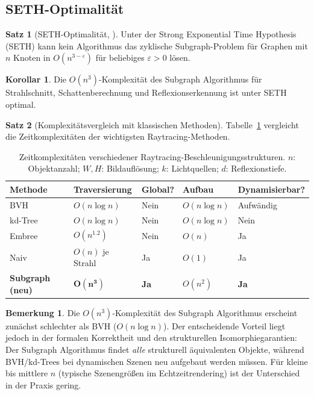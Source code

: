 ﻿\documentclass[a4paper,12pt]{article}
\theoremstyle{definition}
\newtheorem{satz}{Satz}[section]
\newtheorem{korollar}{Korollar}[section]
\newtheorem{bemerkung}{Bemerkung}[section]
\begin{document}
\subsection{SETH-Optimalität}

\begin{satz}[SETH-Optimalität, \citealt{Epp2026}]
  \label{satz:seth}
  Unter der Strong Exponential Time Hypothesis (SETH) kann kein
  Algorithmus das zyklische Subgraph-Problem für Graphen mit $n$
  Knoten in $O(n^{3-\varepsilon})$ für beliebiges $\varepsilon > 0$
  lösen.
\end{satz}

\begin{korollar}
  Die $O(n^3)$-Komplexität des Subgraph Algorithmus für
  Strahlschnitt, Schattenberechnung und Reflexionserkennung ist
  unter SETH optimal.
\end{korollar}

\begin{satz}[Komplexitätsvergleich mit klassischen Methoden]
  \label{satz:komplexitaet_vergleich}
  Tabelle~\ref{tab:komplexitaet} vergleicht die
  Zeitkomplexitäten der wichtigsten Raytracing-Methoden.
\end{satz}

\begin{table}[htbp]
  \centering
  \caption{Zeitkomplexitäten verschiedener Raytracing-Beschleunigungsstrukturen.
           $n$: Objektanzahl; $W, H$: Bildauflösung;
           $k$: Lichtquellen; $d$: Reflexionstiefe.}
  \label{tab:komplexitaet}
  \begin{tabular}{@{}lllll@{}}
    \toprule
    Methode & Traversierung & Global? & Aufbau & Dynamisierbar? \\
    \midrule
    BVH \citep{Rubin1980}    & $O(n \log n)$ & Nein & $O(n \log n)$ & Aufwändig \\
    kd-Tree \citep{Bentley1975} & $O(n \log n)$ & Nein & $O(n \log n)$ & Nein \\
    Embree \citep{Wald2014}  & $O(n^{1.2})$ & Nein & $O(n)$        & Ja \\
    Naiv                     & $O(n)$ je Strahl & Ja & $O(1)$ & Ja \\
    \textbf{Subgraph (neu)}  & $\mathbf{O(n^3)}$ & \textbf{Ja} & $O(n^2)$ & \textbf{Ja} \\
    \bottomrule
  \end{tabular}
\end{table}

\begin{bemerkung}
  Die $O(n^3)$-Komplexität des Subgraph Algorithmus erscheint
  zunächst schlechter als BVH ($O(n \log n)$). Der entscheidende
  Vorteil liegt jedoch in der formalen Korrektheit und den
  strukturellen Isomorphiegarantien: Der Subgraph Algorithmus
  findet \emph{alle} strukturell äquivalenten Objekte, während
  BVH/kd-Trees bei dynamischen Szenen neu aufgebaut werden müssen.
  Für kleine bis mittlere $n$ (typische Szenengrößen im
  Echtzeitrendering) ist der Unterschied in der Praxis gering.
\end{bemerkung}
\end{document}
